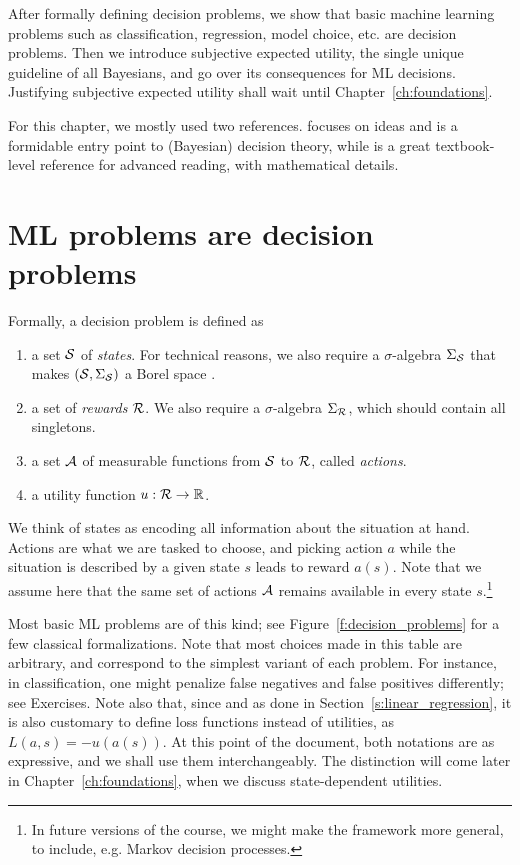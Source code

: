 After formally defining decision problems, we show that basic machine learning problems such as classification, regression, model choice, etc. are decision problems. 
Then we introduce subjective expected utility, the single unique guideline of all Bayesians, and go over its consequences for ML decisions.
Justifying subjective expected utility shall wait until Chapter~\ref{ch:foundations}.

For this chapter, we mostly used two references.
\citep{PaIn09} focuses on ideas and is a formidable entry point to (Bayesian) decision theory, while \citep{Sch12} is a great textbook-level reference for advanced reading, with mathematical details.

\section{ML problems are decision problems}

Formally, a decision problem is defined as 
\begin{enumerate}
    \item a set $\mathcal{S}$ of \emph{states}. For technical reasons, we also require a $\sigma$-algebra $\Sigma_{\mathcal{S}}$ that makes $(\mathcal{S}, \Sigma_{\mathcal{S}})$ a Borel space \citep{Sch12}.
    \item a set of \emph{rewards} $\mathcal{R}$. We also require a $\sigma$-algebra $\Sigma_{\mathcal{R}}$, which should contain all singletons. 
    \item a set $\mathcal{A}$ of measurable functions from $\mathcal{S}$ to $\mathcal{R}$, called \emph{actions}.
    \item a utility function $u:\mathcal{R} \rightarrow \mathbb{R}$.
\end{enumerate}
We think of states as encoding all information about the situation at hand. Actions are what we are tasked to choose, and picking action $a$ while the situation is described by a given state $s$ leads to reward $a(s)$.
Note that we assume here that the same set of actions $\mathcal{A}$ remains available in every state $s$.\footnote{In future versions of the course, we might make the framework more general, to include, e.g. Markov decision processes.} 

Most basic ML problems are of this kind; see Figure~\ref{f:decision_problems} for a few classical formalizations. 
Note that most choices made in this table are arbitrary, and correspond to the simplest variant of each problem. For instance, in classification, one might penalize false negatives and false positives differently; see Exercises.
Note also that, since \cite{Wal50} and as done in Section~\ref{s:linear_regression}, it is also customary to define loss functions instead of utilities, as $L(a,s) = -u(a(s))$. 
At this point of the document, both notations are as expressive, and we shall use them interchangeably.
The distinction will come later in Chapter~\ref{ch:foundations}, when we discuss state-dependent utilities.

